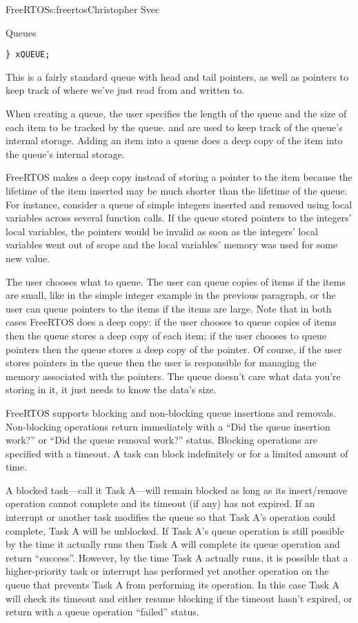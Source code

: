 \begin{aosachapter}{FreeRTOS}{s:freertos}{Christopher Svec}
\begin{aosasect1}{Queues}
\begin{verbatim}
} xQUEUE;
\end{verbatim}

This is a fairly standard queue with head and tail pointers, as well
as pointers to keep track of where we've just read from and written
to.

When creating a queue, the user specifies the length of the queue and
the size of each item to be tracked by the queue.  and
 are used to keep track of the queue's internal
storage. Adding an item into a queue does a deep copy of the item into
the queue's internal storage.

FreeRTOS makes a deep copy instead of storing a pointer to the item
because the lifetime of the item inserted may be much shorter than the
lifetime of the queue.  For instance, consider a queue of simple
integers inserted and removed using local variables across several
function calls.  If the queue stored pointers to the integers' local
variables, the pointers would be invalid as soon as the integers'
local variables went out of scope and the local variables' memory was
used for some new value.

The user chooses what to queue. The user can queue copies of items if
the items are small, like in the simple integer example in the
previous paragraph, or the user can queue pointers to the items if the
items are large. Note that in both cases FreeRTOS does a deep copy: if
the user chooses to queue copies of items then the queue stores a deep
copy of each item; if the user chooses to queue pointers then the
queue stores a deep copy of the pointer. Of course, if the user stores
pointers in the queue then the user is responsible for managing the
memory associated with the pointers. The queue doesn't care what data
you're storing in it, it just needs to know the data's size.

FreeRTOS supports blocking and non-blocking queue insertions and
removals.  Non-blocking operations return immediately with a ``Did the
queue insertion work?'' or ``Did the queue removal work?''
status. Blocking operations are specified with a timeout. A task can
block indefinitely or for a limited amount of time.

A blocked task---call it Task A---will remain blocked as long as its
insert/remove operation cannot complete and its timeout (if any) has
not expired.  If an interrupt or another task modifies the queue so
that Task A's operation could complete, Task A will be unblocked. If
Task A's queue operation is still possible by the time it actually
runs then Task A will complete its queue operation and return
``success''.  However, by the time Task A actually runs, it is possible
that a higher-priority task or interrupt has performed yet another
operation on the queue that prevents Task A from performing its
operation. In this case Task A will check its timeout and either
resume blocking if the timeout hasn't expired, or return with a queue
operation ``failed'' status.


\end{aosasect1}
\end{aosachapter}
